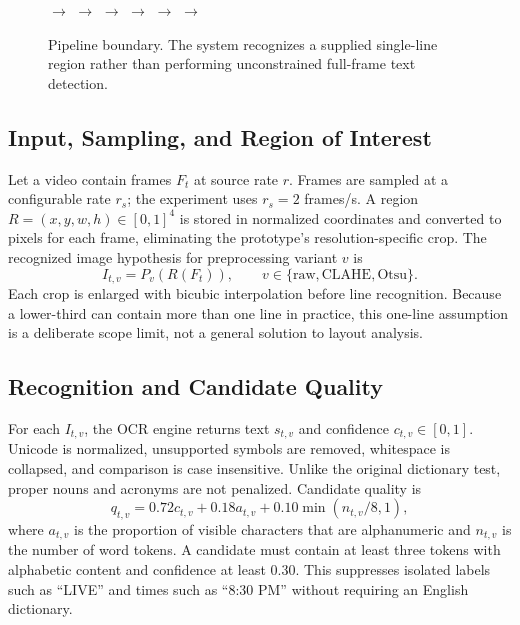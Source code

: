 \documentclass[conference]{IEEEtran}
\begin{document}
\begin{figure}[t]
\centering
\setlength{\fboxsep}{7pt}
$\longrightarrow$
$\longrightarrow$
$\longrightarrow$
$\longrightarrow$
$\longrightarrow$
$\longrightarrow$
\caption{Pipeline boundary.  The system recognizes a supplied single-line region rather than
performing unconstrained full-frame text detection.}
\label{fig:pipeline}
\end{figure}

\subsection{Input, Sampling, and Region of Interest}

Let a video contain frames $F_t$ at source rate $r$.  Frames are sampled at a configurable rate
$r_s$; the experiment uses $r_s=2$ frames/s.  A region
$R=(x,y,w,h)\in[0,1]^4$ is stored in normalized coordinates and converted to pixels for each
frame, eliminating the prototype's resolution-specific crop.  The recognized image hypothesis
for preprocessing variant $v$ is
\begin{equation}
    I_{t,v}=P_v\left(R(F_t)\right), \qquad
    v\in\{\mathrm{raw},\mathrm{CLAHE},\mathrm{Otsu}\}.
\end{equation}
Each crop is enlarged with bicubic interpolation before line recognition.  Because a lower-third
can contain more than one line in practice, this one-line assumption is a deliberate scope limit,
not a general solution to layout analysis.

\subsection{Recognition and Candidate Quality}

For each $I_{t,v}$, the OCR engine returns text $s_{t,v}$ and confidence $c_{t,v}\in[0,1]$.
Unicode is normalized, unsupported symbols are removed, whitespace is collapsed, and comparison
is case insensitive.  Unlike the original dictionary test, proper nouns and acronyms are not
penalized.  Candidate quality is
\begin{equation}
q_{t,v}=0.72c_{t,v}+0.18a_{t,v}+0.10\min(n_{t,v}/8,1),
\end{equation}
where $a_{t,v}$ is the proportion of visible characters that are alphanumeric and $n_{t,v}$ is
the number of word tokens.  A candidate must contain at least three tokens with alphabetic
content and confidence at least 0.30.  This suppresses isolated labels such as ``LIVE'' and
times such as ``8:30 PM'' without requiring an English dictionary.
\end{document}
